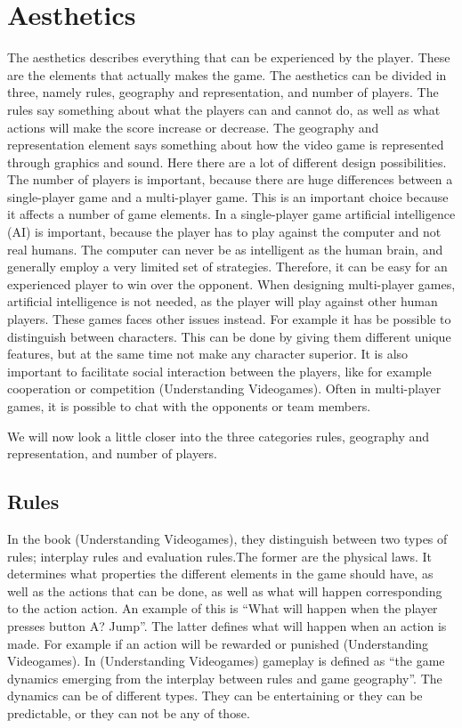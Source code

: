 \section{Aesthetics}
The aesthetics describes everything that can be experienced by the player. These are the elements that actually makes the game. The aesthetics can be divided in three, namely rules, geography and representation, and number of players. The rules say something about what the players can and cannot do, as well as what actions will make the score increase or decrease. The geography and representation element says something about how the video game is represented through graphics and sound. Here there are a lot of different design possibilities. The number of players is important, because there are huge differences between a single-player game and a multi-player game. This is an important choice because it affects a number of game elements. In a single-player game artificial intelligence (AI) is important, because the player has to play against the computer and not real humans. The computer can never be as intelligent as the human brain, and generally employ a very limited set of strategies. Therefore, it can be easy for an experienced player to win over the opponent. When designing multi-player games, artificial intelligence is not needed, as the player will play against other human players. These games faces other issues instead. For example it has be possible to distinguish between characters. This can be done by giving them different unique features, but at the same time not make any character superior. It is also important to facilitate social interaction between the players, like for example cooperation or competition (Understanding Videogames). Often in multi-player games, it is possible to chat with the opponents or team members.

We will now look a little closer into the three categories rules, geography and representation, and number of players.

\subsection{Rules}
In the book (Understanding Videogames), they distinguish between two types of rules; interplay rules and evaluation rules.The former are the physical laws. It determines what properties the different elements in the game should have, as well as the actions that can be done, as well as what will happen corresponding to the action action. An example of this is “What will happen when the player presses button A? Jump”. The latter defines what will happen when an action is made. For example if an action will be rewarded or punished (Understanding Videogames). In (Understanding Videogames) gameplay is defined as “the game dynamics emerging from the interplay between rules and game geography”. The dynamics can be of different types. They can be entertaining or they can be predictable, or they can not be any of those. 

